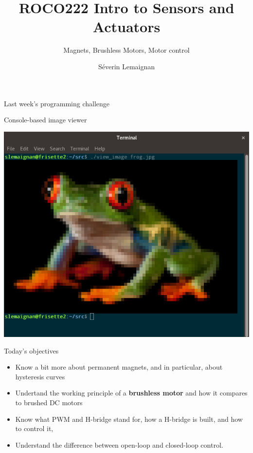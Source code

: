 \documentclass[compress]{beamer}
\title{ROCO222 \newline Intro to Sensors and Actuators}
\subtitle{Magnets, Brushless Motors, Motor control}
\date{}
\author{Séverin Lemaignan}
\institute{Centre for Neural Systems and Robotics\\{\bf Plymouth University}}
\makeatletter
\def\beamer@writeslidentry@miniframesoff{%
  \expandafter\beamer@ifempty\expandafter{\beamer@framestartpage}{}%
  {%
    \clearpage\beamer@notesactions%
  }
}
\newcommand*{\miniframesoff}{\let\beamer@writeslidentry=\beamer@writeslidentry@miniframesoff}
\makeatother
\begin{document}

\maketitle

\miniframesoff

\begin{frame}[fragile]{Last week's programming challenge}

    \Large
    Console-based image viewer

        \begin{center}
            \includegraphics[width=0.7\linewidth]{../part3/figs/coding-challenge-terminal-image}
        \end{center}

\end{frame}

\begin{frame}{Today's objectives}

    \begin{itemize}
        \item Know a bit more about permanent magnets, and in particular, about
            hysteresis curves
        \item Undertand the working principle of a \textbf{brushless motor} and
            how it compares to brushed DC motors
        \item Know what PWM and H-bridge stand for, how a H-bridge is built, and
            how to control it,
        \item Understand the difference between open-loop and closed-loop
            control.

    \end{itemize}
\end{frame}
\end{document}
